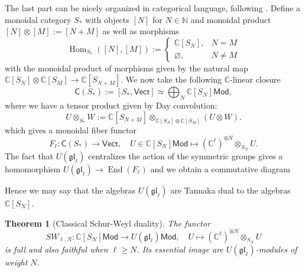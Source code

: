 \documentclass[11pt]{report}
\newtheorem{theorem}{Theorem}[section]
\theoremstyle{definition}
\theoremstyle{remark}
\theoremstyle{remark}
\newcommand{\Hom}{\operatorname{Hom}}
\newcommand{\End}{\operatorname{End}}
\newcommand{\N}{\mathbb{N}}
\newcommand{\C}{\mathbb{C}}
\begin{document}
The last part can be nicely organized in categorical language, following \cite{article:davydov:2010}. Define a monoidal category $S_*$ with objects $[N]$ for $N \in \N$ and monoidal product $[N] \otimes [M] := [N+M]$ as well as morphisms
\begin{equation*}
\Hom_{S_*}([N],[M]) :=
\begin{cases}
\C[S_N], & N = M \\
\varnothing, & N \neq M
\end{cases}
\end{equation*}
with the monoidal product of morphisms given by the natural map $\C[S_N] \otimes \C[S_M] \to \C[S_{N+M}]$. We now take the following $\C$-linear closure
\begin{equation*}
\mathsf{C}(S_*) := [S_*,\mathsf{Vect}] \simeq \bigoplus_N \C[S_N]\mathsf{Mod},
\end{equation*}
where we have a tensor product given by Day convolution:
\begin{equation*}
U \otimes_{S_*} W := \C[S_{N+M}] \otimes_{\C[S_N] \otimes \C[S_M]} (U \otimes W).
\end{equation*}
which gives a monoidal fiber functor
\begin{equation*}
F_\ell: \mathsf{C}(S_*) \to \mathsf{Vect}, \quad U \in \C[S_N]\mathsf{Mod} \mapsto (\C^\ell)^{\otimes N} \otimes_{S_N} U.
\end{equation*}
The fact that $U(\mathfrak{gl}_\ell)$ centralizes the action of the symmetric groups gives a homomorphism $U(\mathfrak{gl}_\ell) \to \End(F_\ell)$ and we obtain a commutative diagram
\begin{center}
\end{center}
Hence we may say that the algebras $U(\mathfrak{gl}_\ell)$ are Tannaka dual to the algebras $\C[S_N]$.

\begin{theorem}[Classical Schur-Weyl duality]
The functor
\begin{equation*}
SW_{\ell,N}: \C[S_N]\mathsf{Mod} \to U(\mathfrak{gl}_\ell)\mathsf{Mod}, \quad U \mapsto (\C^\ell)^{\otimes N} \otimes_{S_N} U
\end{equation*}
is full and also faithful when $\ell \geq N$. Its essential image are $U(\mathfrak{gl}_\ell)$-modules of weight $N$.
\end{theorem}
\end{document}
